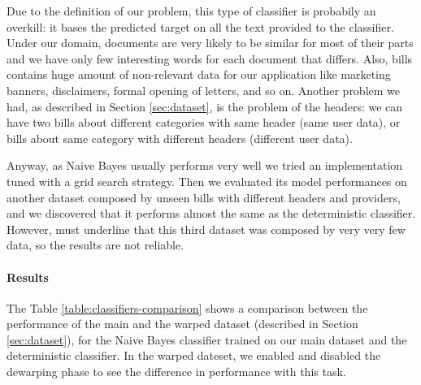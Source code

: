 \documentclass[10pt,twocolumn,letterpaper]{article}
\begin{document}
Due to the definition of our problem, this type of classifier
is probabily an overkill: it bases the predicted target on all the
text provided to the classifier. Under our domain, documents are very
likely to be similar for most of their parts and we have only few
interesting words for each document that differs. Also, bills contains
huge amount of non-relevant data for our application like marketing
banners, disclaimers, formal opening of letters, and so on. Another
problem we had, as described in Section \ref{sec:dataset}, is the
problem of the headers: we can have two bills about different
categories with same header (same user data), or bills about same
category with different headers (different user data).

Anyway, as Naive Bayes usually performs very well we tried an
implementation tuned with a grid search strategy. Then we evaluated
its model performances on another dataset composed by unseen bills
with different headers and providers, and we discovered that it
performs almost the same as the deterministic classifier.  However,
must underline that this third dataset was composed by very very few
data, so the results are not reliable.

\paragraph{Results}

The Table \ref{table:classifiers-comparison} shows a comparison
between the performance of the main and the warped dataset (described
in Section \ref{sec:dataset}), for the Naive Bayes classifier trained
on our main dataset and the deterministic classifier. In the warped
dateset, we enabled and disabled the dewarping phase to see the
difference in performance with this task.
\end{document}
